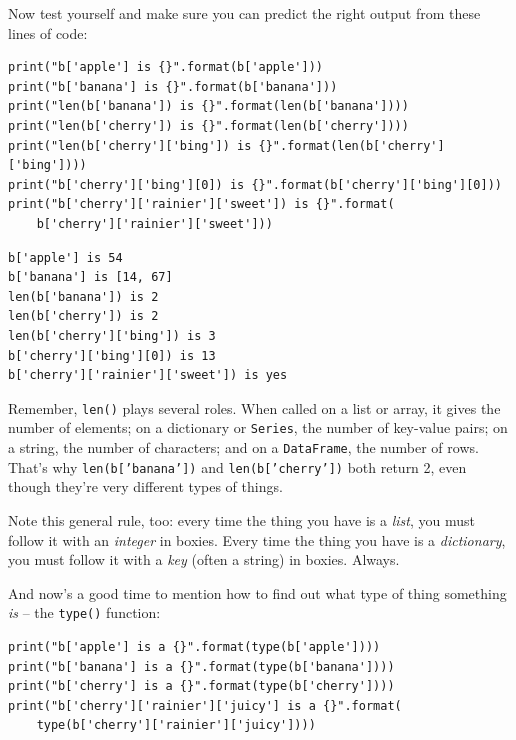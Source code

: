 Now test yourself and make sure you can predict the right output from these
lines of code:

\begin{Verbatim}[fontsize=\small,samepage=true,frame=single,framesep=3mm]
print("b['apple'] is {}".format(b['apple']))
print("b['banana'] is {}".format(b['banana']))
print("len(b['banana']) is {}".format(len(b['banana'])))
print("len(b['cherry']) is {}".format(len(b['cherry'])))
print("len(b['cherry']['bing']) is {}".format(len(b['cherry']['bing'])))
print("b['cherry']['bing'][0]) is {}".format(b['cherry']['bing'][0]))
print("b['cherry']['rainier']['sweet']) is {}".format(
    b['cherry']['rainier']['sweet']))
\end{Verbatim}
\vspace{-.2in}

\begin{Verbatim}[fontsize=\small,samepage=true,frame=leftline,framesep=5mm,framerule=1mm]
b['apple'] is 54
b['banana'] is [14, 67]
len(b['banana']) is 2
len(b['cherry']) is 2
len(b['cherry']['bing']) is 3
b['cherry']['bing'][0]) is 13
b['cherry']['rainier']['sweet']) is yes
\end{Verbatim}


Remember, \texttt{len()} plays several roles. When called on a list or array,
it gives the number of elements; on a dictionary or \texttt{Series}, the number
of key-value pairs; on a string, the number of characters; and on a
\texttt{DataFrame}, the number of rows. That's why \texttt{len(b['banana'])}
and \texttt{len(b['cherry'])} both return 2, even though they're very different
types of things.


Note this general rule, too: every time the thing you have is a \textit{list},
you must follow it with an \textit{integer} in boxies. Every time the thing you
have is a \textit{dictionary}, you must follow it with a \textit{key} (often a
string) in boxies. Always.

And now's a good time to mention how to find out what type of thing something
\textit{is} -- the \texttt{type()} function:

\begin{Verbatim}[fontsize=\small,samepage=true,frame=single,framesep=3mm]
print("b['apple'] is a {}".format(type(b['apple'])))
print("b['banana'] is a {}".format(type(b['banana'])))
print("b['cherry'] is a {}".format(type(b['cherry'])))
print("b['cherry']['rainier']['juicy'] is a {}".format(
    type(b['cherry']['rainier']['juicy'])))
\end{Verbatim}
\vspace{-.2in}

